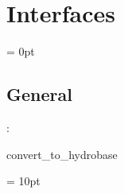 
\section{Interfaces} 


\parskip = 0pt

\vspace{3mm} \subsection*{General}

: 

convert\_to\_hydrobase
\vspace{2mm}

\vspace{5mm}\parskip = 10pt 
